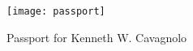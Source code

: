 \documentclass[11pt]{article}
\begin{document}
\begin{figure}[t]
  \centering
  \begin{minipage}[t]{0.9\linewidth}
    \texttt{[image: passport]}
    \caption{Passport for Kenneth W. Cavagnolo}
  \end{minipage}
\end{figure}
\end{document}
